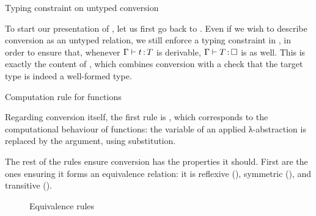 \begin{marginfigure}
  \ContinuedFloat*
  \begin{mathpar}
    \label{rule:cic-conv-unty}
  \end{mathpar}
  \caption{Typing constraint on untyped conversion}
\end{marginfigure}

To start our presentation of ,
let us first go back to .
Even if we wish to describe conversion as
an untyped relation, we still enforce a typing constraint in ,
in order to ensure that, whenever $\Gamma \vdash t \ty T$ is derivable,
$\Gamma \vdash T \ty \uni$ is as well.
This is exactly the content of , which combines conversion
with a check that the target type is indeed a well-formed type.

\begin{marginfigure}
  \ContinuedFloat
  \begin{mathpar}
    \label{rule:cic-uconv-beta}
  \end{mathpar}
  \caption{Computation rule for functions}
\end{marginfigure}

Regarding conversion itself, the first rule is ,
which corresponds to the computational behaviour
of functions: the variable of an applied λ-abstraction is replaced by the argument, using
substitution.

The rest of the rules ensure conversion has the properties it should. First are the
ones ensuring it forms an equivalence relation: it
is reflexive (), symmetric (),
and transitive ().

\begin{figure}[ht]
  \ContinuedFloat
  \caption{Equivalence rules}
  \label{fig:cic-uconv-equiv}
\end{figure}

